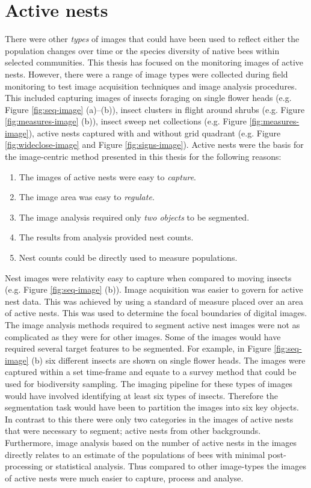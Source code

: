 \section{Active nests}
There were other \emph{types} of images that could have been used to reflect either the population changes over time or the species diversity of native bees within selected communities. This thesis has focused on the monitoring images of active nests. However, there were a range of image types were collected during field monitoring to test image acquisition techniques and image analysis procedures. This included capturing images of insects foraging on single flower heads (e.g. Figure \ref{fig:seq-image} (a)--(b)), insect clusters in flight around shrubs (e.g. Figure \ref{fig:measures-image} (b)), insect sweep net collections (e.g. Figure \ref{fig:measures-image}), active nests captured with and without grid quadrant (e.g. Figure \ref{fig:wideclose-image} and Figure \ref{fig:signs-image}). Active nests were the basis for the image-centric method presented in this thesis for the following reasons:

\begin{enumerate}
\item The images of active nests were easy to \emph{capture}.
\item The image area was easy to \emph{regulate}.
\item The image analysis required only \emph{two objects} to be segmented.
\item The results from analysis provided nest counts.
\item Nest counts could be directly used to measure populations.
\end{enumerate}

Nest images were relativity easy to capture when compared to moving insects (e.g. Figure \ref{fig:seq-image} (b)). Image acquisition was easier to govern for active nest data. This was achieved by using a standard of measure placed over an area of active nests. This was used to determine the focal boundaries of digital images.
The image analysis methods required to segment active nest images were not as complicated
as they were for other images. Some of the images would have required several target features to be segmented. For example, in Figure \ref{fig:seq-image} (b) six different insects are shown on single flower heads. The images were captured within a set time-frame and equate to a survey method that could be used for biodiversity sampling. The imaging pipeline for these types of images would have involved identifying at least six types of insects. Therefore the segmentation task would have been to partition the images into six key objects. In contrast to this there were only two categories in the  images of active nests that were necessary to segment; active nests from other backgrounds. Furthermore, image analysis based on the number of active nests in the images directly relates to an estimate of the populations of bees with minimal post-processing or statistical analysis. Thus compared to other image-types the images of active nests were much easier to capture, process and analyse. 

